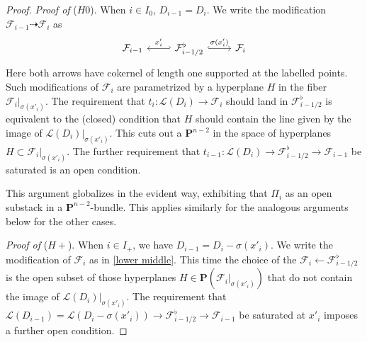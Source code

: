 \documentclass[reqno]{amsart}
\numberwithin{equation}{section}
\newcommand{\PP}{\mathbf{P}}
\newcommand{\s}{\sigma}
\newcommand\cF{\mathcal{F}}
\newcommand\cL{\mathcal{L}}
\theoremstyle{remark}
\numberwithin{equation}{section}
\begin{document}
\begin{proof}
\emph{Proof of }($H0$). When $i\in I_{0}$, $D_{i-1}=D_{i}$. We write the modification $\cF_{i-1}\dashrightarrow\cF_{i}$ as 
\begin{equation}\label{lower middle}
\begin{tikzcd}
\cF_{i-1} & \cF^{\flat}_{i-1/2}\ar[r, "\s(x'_{i})", hook] \ar[l, "{x'_{i}}"', hook']  & \cF_{i} 
\end{tikzcd}
\end{equation}
Here both arrows have cokernel of length one supported at the labelled points. Such modifications of $\cF_{i}$ are parametrized by a hyperplane $H$ in the fiber $\cF_{i}|_{\s(x'_{i})}$. 
The requirement that $t_{i}:\cL(D_{i})\to \cF_{i}$ should land in $\cF^{\flat}_{i-1/2}$ is equivalent to the (closed) condition that $H$ should contain the line given by the image of $\cL(D_{i})|_{\s(x'_{i})}$. This cuts out a $\PP^{n-2}$ in the space of hyperplanes $H \subset \cF_{i}|_{\s(x'_{i})}$. The further requirement that $t_{i-1}:\cL(D_{i})\to \cF^{\flat}_{i-1/2}\to \cF_{i-1}$ be saturated is an open condition. 

This argument globalizes in the evident way, exhibiting that $\Pi_i$ as an open substack in a $\PP^{n-2}$-bundle. This applies similarly for the analogous arguments below for the other cases. 


\emph{Proof of} ($H+$). When $i\in I_{+}$, we have $D_{i-1}=D_{i}-\s(x'_{i})$. We write the modification of $\cF_{i}$ as in \eqref{lower middle}. This time the choice of the $\cF_{i}\leftarrow\cF^{\flat}_{i-1/2}$ is the open subset of those hyperplanes $H\in \PP(\cF_{i}|_{\s(x'_{i})})$ that do not contain the image of $\cL(D_{i})|_{\s(x'_{i})}$. The requirement that $\cL(D_{i-1})=\cL(D_{i}-\s(x'_{i}))\to \cF^{\flat}_{i-1/2}\to \cF_{i-1}$ be saturated at $x'_{i}$ imposes a further open condition. 


\end{proof}
\end{document}
